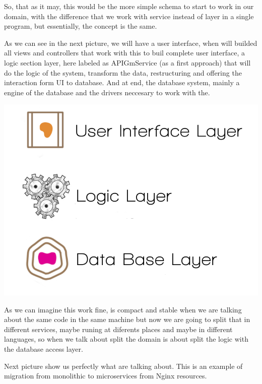 So, that as it may, this would be the more simple schema to start to work in
our domain, with the difference that we work with service instead of layer in a
single program, but essentially, the concept is the same.

As we can see in the next picture, we will have a user interface, when  will
builded all views and controllers that work with this to buil complete user
interface, a logic section layer, here labeled as APIGmService (as a first
approach) that will do the logic of the system, transform the data,
restructuring and offering the interaction form UI to database.
And at end, the database system, mainly a engine of the database and the drivers
neccesary to work with the.

\begin{center}
\includegraphics[scale=0.3]{img/graphics/initial_microservices_distribution.png}
\end{center}

As we can imagine this work fine, is compact and stable when we are talking about
the same code in the same machine but now we are going to split that in
different services, maybe runing at diferents places and maybe in different
languages, so when we talk about split the domain is about split the logic with
the database access layer.

Next picture show us perfectly what are talking about. This is an example
of migration from monolithic to microservices from Nginx resources.

